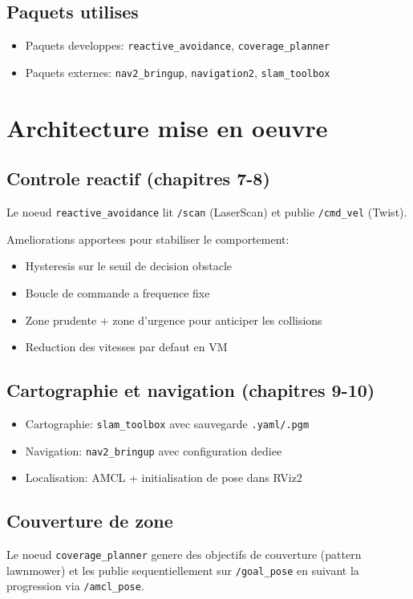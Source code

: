 \documentclass[11pt,a4paper,french]{imta}
\begin{document}
\subsection{Paquets utilises}
\begin{itemize}
  \item Paquets developpes: \texttt{reactive\_avoidance}, \texttt{coverage\_planner}
  \item Paquets externes: \texttt{nav2\_bringup}, \texttt{navigation2}, \texttt{slam\_toolbox}
\end{itemize}

\section{Architecture mise en oeuvre}
\subsection{Controle reactif (chapitres 7-8)}
Le noeud \texttt{reactive\_avoidance} lit \texttt{/scan} (LaserScan) et publie \texttt{/cmd\_vel} (Twist).

Ameliorations apportees pour stabiliser le comportement:
\begin{itemize}
  \item Hysteresis sur le seuil de decision obstacle
  \item Boucle de commande a frequence fixe
  \item Zone prudente + zone d'urgence pour anticiper les collisions
  \item Reduction des vitesses par defaut en VM
\end{itemize}

\subsection{Cartographie et navigation (chapitres 9-10)}
\begin{itemize}
  \item Cartographie: \texttt{slam\_toolbox} avec sauvegarde \texttt{.yaml/.pgm}
  \item Navigation: \texttt{nav2\_bringup} avec configuration dediee
  \item Localisation: AMCL + initialisation de pose dans RViz2
\end{itemize}

\subsection{Couverture de zone}
Le noeud \texttt{coverage\_planner} genere des objectifs de couverture (pattern lawnmower) et les publie sequentiellement sur \texttt{/goal\_pose} en suivant la progression via \texttt{/amcl\_pose}.
\end{document}
